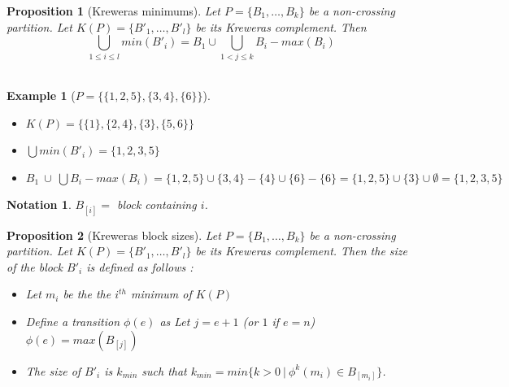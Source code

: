 \documentclass[12pt]{report}
\newtheorem*{prop}{Proposition}
\newtheorem*{example}{Example}
\newtheorem*{notation}{Notation}
\begin{document}
\begin{prop}[Kreweras minimums]
        Let $P = \{B_1, \ldots, B_k\}$ be a non-crossing partition.
        Let $K (P) = \{B'_1, \ldots, B'_l\}$ be its Kreweras complement.
        Then $$\bigcup_{1 \leq i \leq l}{min (B'_i)} =
        B_1 \cup \bigcup_{1 < j \leq k}{B_i - {max (B_i)}}$$\\
\end{prop}

\begin{example}[$P = \{\{1, 2, 5\}, \{3, 4\}, \{6\}\}$]
    \text{}\\
    \begin{itemize}
        \item $K (P) = \{\{1\},\{2, 4\}, \{3\}, \{5, 6\}\}$
        \item $\bigcup{min (B'_i)} = \{1, 2, 3, 5\}$
        \item $B_1\ \cup\ \bigcup{B_i - {max (B_i)}}
        = \{1, 2, 5\} \cup \{3, 4\} - \{4\} \cup \{6\} - \{6\}
        = \{1, 2, 5\} \cup \{3\} \cup \emptyset = \{1, 2, 3, 5\}$\\
    \end{itemize}
\end{example}

\begin{notation}
    $B_{[i]} = $ block containing $i$.
\end{notation}

\begin{prop}[Kreweras block sizes]
    Let $P = \{B_1, \ldots, B_k\}$ be a non-crossing partition.
    Let $K (P) = \{B'_1, \ldots, B'_l\}$ be its Kreweras complement.
    Then the size of the block $B'_i$ is defined as follows :
    \begin{itemize}
        \item Let $m_i$ be the the $i^{th}$ minimum of $K (P)$
        \item Define a \emph{transition} $\phi (e)$ as 
            \subitem Let $j = e + 1$ (or $1$ if $e = n$)
            \subitem $\phi(e) = max (B_{[j]})$
        \item The size of $B'_i$ is $k_{min}$ such that
        $k_{min} = min \{k > 0\ |\ \phi^k (m_i) \in B_{[m_i]}\}$.\\
    \end{itemize}
\end{prop}
\end{document}
